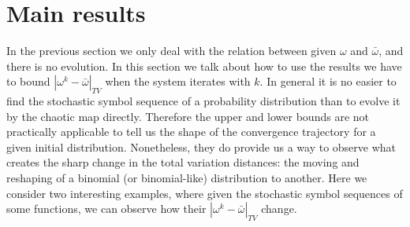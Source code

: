 





\section{Main results}
\label{sec:mainresults}
In the previous section we only deal with the relation between given $\omega$ and $\bar{\omega}$, and there is no evolution. In this section we talk about how to use the results we have to bound $|\omega^k-\bar{\omega}|_{TV}$ when the system iterates with $k$. In general it is no easier to find the stochastic symbol sequence of a probability distribution than to evolve it by the chaotic map directly. Therefore the upper and lower bounds are not practically applicable to tell us the shape of the convergence trajectory for a given initial distribution. Nonetheless, they do provide us a way to observe what creates the sharp change in the total variation distances: the moving and reshaping of a binomial (or binomial-like) distribution to another. Here we consider two interesting examples, where given the stochastic symbol sequences of some functions, we can observe how their $|\omega^k-\bar{\omega}|_{TV}$ change.

